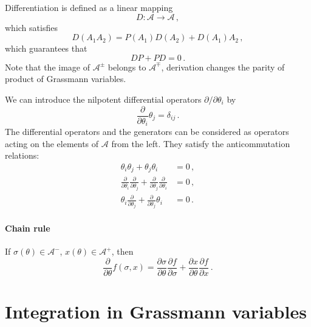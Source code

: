 \begin{subappendices}
Differentiation is defined as a linear mapping
\begin{equation}
  \label{eq:GrassDiff}
  D: \mathcal{A} \to \mathcal{A}\, ,
\end{equation}
which satisfies
\begin{equation}
  \label{eq:GrassDiffProp}
  D(A_1 A_2) = P(A_1) D(A_2) + D(A_1) A_2\, ,
\end{equation}
which guarantees that
\begin{equation}
  \label{eq:GrassDiffParity}
  D P + P D = 0\, .
\end{equation}
Note that the image of $\mathcal{A}^\pm$ belongs to
$\mathcal{A}^\mp$, \ie derivation changes the parity of product of
Grassmann variables. 

We can introduce the nilpotent differential operators
$\partial/\partial\theta_i$ by
\begin{equation}
  \label{eq:DiffOpsBasis}
  \frac{\partial}{\partial \theta_i} \theta_j = \delta_{ij}\, . 
\end{equation}
The differential operators and the generators can be considered as
operators acting on the elements of $\mathcal{A}$ from the left. They
satisfy the anticommutation relations:
\begin{align}
  \label{eq:AntiComm1}
  \theta_i \theta_j + \theta_j \theta_i &= 0\, ,\\
  \label{eq:AntiComm2}
  \frac{\partial}{\partial\theta_i} \frac{\partial}{\partial\theta_j}
  + \frac{\partial}{\partial\theta_j}
  \frac{\partial}{\partial\theta_i} &= 0\, , \\
  \label{eq:AntiComm3}
  \theta_i \frac{\partial}{\partial\theta_j} +
  \frac{\partial}{\partial\theta_j} \theta_i &= 0\, .
\end{align}

\paragraph{Chain rule}

If $\sigma(\theta)\in\mathcal{A}^-$, $x(\theta)\in \mathcal{A}^+$,
then
\begin{equation}
  \label{eq:GrassChainRule}
  \frac{\partial}{\partial\theta} f(\sigma,x) = 
  \frac{\partial\sigma}{\partial\theta} \frac{\partial
    f}{\partial\sigma} 
  + \frac{\partial x}{\partial\theta} \frac{\partial f}{\partial x}\, .
\end{equation}

\section{Integration in Grassmann variables}
\label{sec:integr-grassm-vari}


\end{subappendices}
